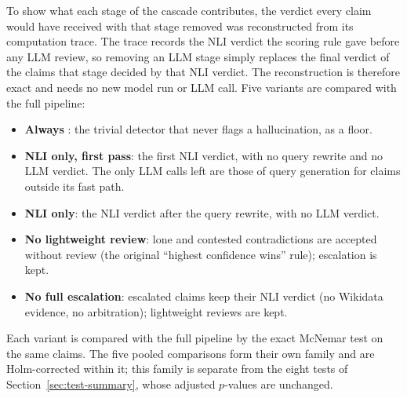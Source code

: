 To show what each stage of the cascade contributes, the verdict every claim would have received with that stage removed was reconstructed from its computation trace. The trace records the NLI verdict the scoring rule gave before any LLM review, so removing an LLM stage simply replaces the final verdict of the claims that stage decided by that NLI verdict. The reconstruction is therefore exact and needs no new model run or LLM call. Five variants are compared with the full pipeline:
\begin{itemize}[itemsep=0.2em]
  \item \textbf{Always \Sup}: the trivial detector that never flags a hallucination, as a floor.
  \item \textbf{NLI only, first pass}: the first NLI verdict, with no query rewrite and no LLM verdict. The only LLM calls left are those of query generation for claims outside its fast path.
  \item \textbf{NLI only}: the NLI verdict after the query rewrite, with no LLM verdict.
  \item \textbf{No lightweight review}: lone and contested contradictions are accepted without review (the original ``highest confidence wins'' rule); escalation is kept.
  \item \textbf{No full escalation}: escalated claims keep their NLI verdict (no Wikidata evidence, no arbitration); lightweight reviews are kept.
\end{itemize}
Each variant is compared with the full pipeline by the exact McNemar test on the same claims. The five pooled comparisons form their own family and are Holm-corrected within it; this family is separate from the eight tests of Section~\ref{sec:test-summary}, whose adjusted $p$-values are unchanged.

